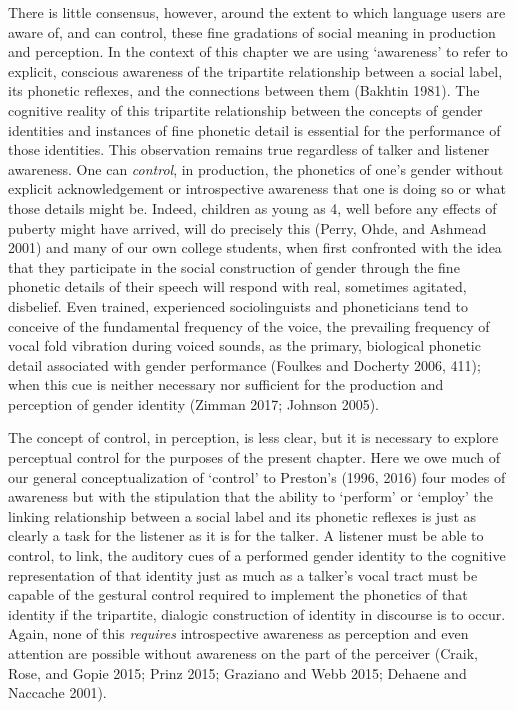 \documentclass[
  letterpaper,
  DIV=11,
  numbers=noendperiod]{scrartcl}
\begin{document}
There is little consensus, however, around the extent to which language
users are aware of, and can control, these fine gradations of social
meaning in production and perception. In the context of this chapter we
are using `awareness' to refer to explicit, conscious awareness of the
tripartite relationship between a social label, its phonetic reflexes,
and the connections between them (Bakhtin 1981). The cognitive reality
of this tripartite relationship between the concepts of gender
identities and instances of fine phonetic detail is essential for the
performance of those identities. This observation remains true
regardless of talker and listener awareness. One can \emph{control}, in
production, the phonetics of one's gender without explicit
acknowledgement or introspective awareness that one is doing so or what
those details might be. Indeed, children as young as 4, well before any
effects of puberty might have arrived, will do precisely this (Perry,
Ohde, and Ashmead 2001) and many of our own college students, when first
confronted with the idea that they participate in the social
construction of gender through the fine phonetic details of their speech
will respond with real, sometimes agitated, disbelief. Even trained,
experienced sociolinguists and phoneticians tend to conceive of the
fundamental frequency of the voice, the prevailing frequency of vocal
fold vibration during voiced sounds, as the primary, biological phonetic
detail associated with gender performance (Foulkes and Docherty 2006,
411); when this cue is neither necessary nor sufficient for the
production and perception of gender identity (Zimman 2017; Johnson
2005).

The concept of control, in perception, is less clear, but it is
necessary to explore perceptual control for the purposes of the present
chapter. Here we owe much of our general conceptualization of `control'
to Preston's (1996, 2016) four modes of awareness but with the
stipulation that the ability to `perform' or `employ' the linking
relationship between a social label and its phonetic reflexes is just as
clearly a task for the listener as it is for the talker. A listener must
be able to control, to link, the auditory cues of a performed gender
identity to the cognitive representation of that identity just as much
as a talker's vocal tract must be capable of the gestural control
required to implement the phonetics of that identity if the tripartite,
dialogic construction of identity in discourse is to occur. Again, none
of this \emph{requires} introspective awareness as perception and even
attention are possible without awareness on the part of the perceiver
(Craik, Rose, and Gopie 2015; Prinz 2015; Graziano and Webb 2015;
Dehaene and Naccache 2001).
\end{document}
